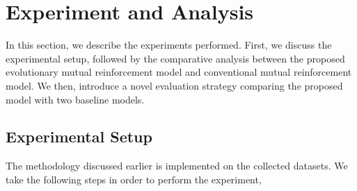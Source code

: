 \section{\label{exp}\textbf{Experiment and Analysis}}



In this section, we describe the experiments performed. First, we discuss the experimental setup, followed by the comparative analysis between the proposed evolutionary mutual reinforcement model and conventional mutual reinforcement model. We then, introduce a novel evaluation strategy comparing the proposed model with two baseline models.
\subsection{\textbf{Experimental Setup}}
The methodology discussed earlier is implemented on the collected datasets. We take the following steps in order to perform the experiment,

